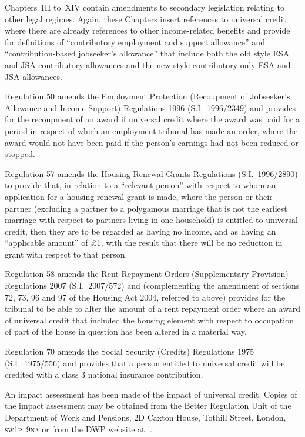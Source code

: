 \documentclass[12pt,a4paper]{article}
\begin{document}
Chapters~III to~XIV contain amendments to secondary legislation relating to other legal regimes. Again, these Chapters insert references to universal credit where there are already references to other income-related benefits and provide for definitions of “contributory employment and support allowance” and “contribution-based jobseeker’s allowance” that include both the old style ESA and JSA contributory allowances and the new style contributory-only ESA and JSA allowances.

Regulation 50 amends the Employment Protection (Recoupment of Jobseeker’s Allowance and Income Support) Regulations 1996 (S.I.~1996/2349) and provides for the recoupment of an award if universal credit where the award was paid for a period in respect of which an employment tribunal has made an order, where the award would not have been paid if the person’s earnings had not been reduced or stopped.

Regulation 57 amends the Housing Renewal Grants Regulations (S.I.~1996\slash 2890) to provide that, in relation to a “relevant person” with respect to whom an application for a housing renewal grant is made, where the person or their partner (excluding a partner to a polygamous marriage that is not the earliest marriage with respect to partners living in one household) is entitled to universal credit, then they are to be regarded as having no income, and as having an “applicable amount” of £1, with the result that there will be no reduction in grant with respect to that person.

Regulation 58 amends the Rent Repayment Orders (Supplementary Provision) Regulations 2007 (S.I.~2007/572) and (complementing the amendment of sections 72, 73, 96 and 97 of the Housing Act 2004, referred to above) provides for the tribunal to be able to alter the amount of a rent repayment order where an award of universal credit that included the housing element with respect to occupation of part of the house in question has been altered in a material way.

Regulation 70 amends the Social Security (Credits) Regulations 1975 (S.I.~1975\slash 556) and provides that a person entitled to universal credit will be credited with a class 3 national insurance contribution.

An impact assessment has been made of the impact of universal credit. Copies of the impact assessment may be obtained from the Better Regulation Unit of the Department of Work and Pensions, 2D Caxton House, Tothill Street, London, \textsc{\lowercase{SW1P~9NA}} or from the DWP website at: \href{http://www.dwp.gov.uk/policy/welfare-reform/legislation-and-key-documents/welfare-reform-act-2012/impact-assessments-and-equality/}{}.
\end{document}

